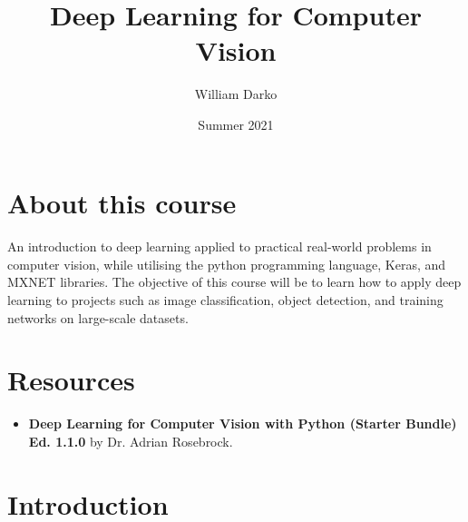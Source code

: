 \documentclass[12pt, a4paper]{article}
\title{Deep Learning for Computer Vision}
\author{William Darko}
\date{Summer 2021}
\begin{document}
\maketitle
\newpage

\tableofcontents

\newpage

\section{About this course}
\paragraph*{}
An introduction to deep learning applied to practical real-world problems in
computer vision, while utilising the python programming language, Keras, and MXNET libraries.
The objective of this course will be to learn how to apply deep learning to projects such as image classification,
object detection, and training networks on large-scale datasets.

\newpage

\section{Resources}

\begin{itemize}
   \item \textbf{Deep Learning for Computer Vision with Python (Starter Bundle) Ed. 1.1.0}
   by Dr. Adrian Rosebrock.
\end{itemize}

\newpage

\section{Introduction}
\end{document}
